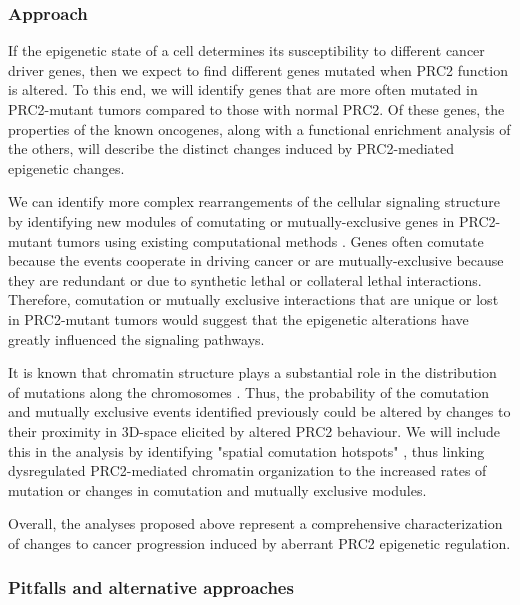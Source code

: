 \subsubsection*{Approach}

If the epigenetic state of a cell determines its susceptibility to different cancer driver genes, then we expect to find different genes mutated when PRC2 function is altered.
To this end, we will identify genes that are more often mutated in PRC2-mutant tumors compared to those with normal PRC2. 
Of these genes, the properties of the known oncogenes, along with a functional enrichment analysis of the others, will describe the distinct changes induced by PRC2-mediated epigenetic changes.

We can identify more complex rearrangements of the cellular signaling structure by identifying new modules of comutating or mutually-exclusive genes in PRC2-mutant tumors using existing computational methods \cite{Miller2011, Vandin2012, Ciriello2012, Jia2014, Zhang2014c, Ahmed2015, Kim2015, Leiserson2015, Babur2015, Leiserson2015b, Dao2017, Leiserson2016, Cho2016a, Reyna2018, Zhang2018e, Bokhari2020QuaDMutNetEx:Frequency.}.
Genes often comutate because the events cooperate in driving cancer or are mutually-exclusive because they are redundant or due to synthetic lethal \cite{Kaelin2005} or collateral lethal \cite{Muller2015} interactions.
Therefore, comutation or mutually exclusive interactions that are unique or lost in PRC2-mutant tumors would suggest that the epigenetic alterations have greatly influenced the signaling pathways.

It is known that chromatin structure plays a substantial role in the distribution of mutations along the chromosomes \cite{Schuster-Bockler2012, Polak2015, Gonzalez-Perez2019}.
Thus, the probability of the comutation and mutually exclusive events identified previously could be altered by changes to their proximity in 3D-space elicited by altered PRC2 behaviour.
We will include this in the analysis by identifying "spatial comutation hotspots" \cite{Shi2016ChromatinGenes}, thus linking dysregulated PRC2-mediated chromatin organization to the increased rates of mutation or changes in comutation and mutually exclusive modules.

Overall, the analyses proposed above represent a comprehensive characterization of changes to cancer progression induced by aberrant PRC2 epigenetic regulation.


\subsubsection*{Pitfalls and alternative approaches}

